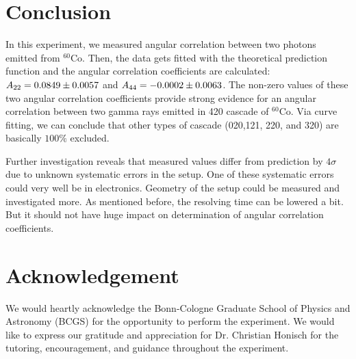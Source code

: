 \section{Conclusion}\label{sec:conclusion}
In this experiment, we measured angular correlation between two photons emitted from ${}^{60}\text{Co}$. Then, the data gets fitted with the theoretical prediction function and  the angular correlation coefficients are calculated:  $ A_{22}= \num{0.0849 +- 0.0057} $ and $A_{44}=\num{-0.0002 +- 0.0063} $. The non-zero values of these two angular correlation coefficients provide strong evidence for an angular correlation between two gamma rays emitted in 420 cascade of $ ^{60}\text{Co} $. Via curve fitting, we can conclude that other types of cascade (020,121, 220, and 320) are basically $100\%$ excluded.

Further investigation reveals that measured values differ from prediction by $4\sigma$ due to unknown systematic errors in the setup. One of these systematic errors could very well be in electronics. Geometry of the setup could be measured and investigated more. As mentioned before, the resolving time can be lowered a bit. But it should not have huge impact on determination of angular correlation coefficients. 

\section{Acknowledgement}
We would heartly acknowledge the Bonn-Cologne Graduate School of Physics and Astronomy (BCGS) for the opportunity to perform the experiment. We would like to express our gratitude and appreciation for Dr. Christian Honisch for the tutoring, encouragement, and guidance throughout the experiment.
